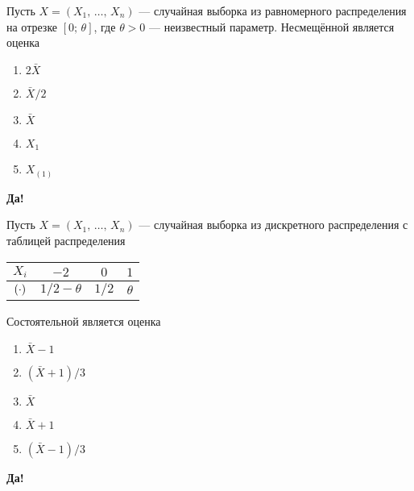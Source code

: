 \documentclass[t]{beamer}
\let\P\relax
\DeclareMathOperator{\P}{\mathbb{P}}
\begin{document}
 \begin{frame} \label{27-Yes} 
\begin{block}{27} 

   Пусть $X = (X_1, \, \ldots, \, X_n)$ — случайная выборка из равномерного распределения на отрезке $[0; \, \theta]$, где $\theta > 0$ — неизвестный параметр. Несмещённой является оценка


 \end{block} 
\begin{enumerate} 
\item[] \hyperlink{27-Yes}{\beamergotobutton{} $2 \bar{X}$}
\item[] \hyperlink{27-No}{\beamergotobutton{} $\bar{X} / 2$}
\item[] \hyperlink{27-No}{\beamergotobutton{} $\bar{X}$}
\item[] \hyperlink{27-No}{\beamergotobutton{} $X_1$}
\item[] \hyperlink{27-No}{\beamergotobutton{} $X_{(1)}$}
\end{enumerate} 

 \textbf{Да!} 
 \hyperlink{28}{}\end{frame} 


 \begin{frame} \label{28-Yes} 
\begin{block}{28} 

    Пусть $X = (X_1, \, \ldots, \, X_n)$ — случайная выборка из дискретного распределения с таблицей распределения

  \begin{center}
	\begin{tabular}{cccc}
		\toprule
		$X_i$    & $-2$     & $0$   & $1$  \\
		\midrule
		$\P(\cdot)$        & $1/2 - \theta$      & $1/2$    & $\theta$  \\
		\bottomrule
	\end{tabular}
\end{center}

Состоятельной является оценка


 \end{block} 
\begin{enumerate} 
\item[] \hyperlink{28-No}{\beamergotobutton{} $\bar{X} - 1$}
\item[] \hyperlink{28-Yes}{\beamergotobutton{} $(\bar{X} + 1) / 3$}
\item[] \hyperlink{28-No}{\beamergotobutton{} $\bar{X}$}
\item[] \hyperlink{28-No}{\beamergotobutton{} $\bar{X} + 1$}
\item[] \hyperlink{28-No}{\beamergotobutton{} $(\bar{X} - 1) / 3$}
\end{enumerate} 

 \textbf{Да!} 
 \hyperlink{29}{}\end{frame} 
\end{document}

